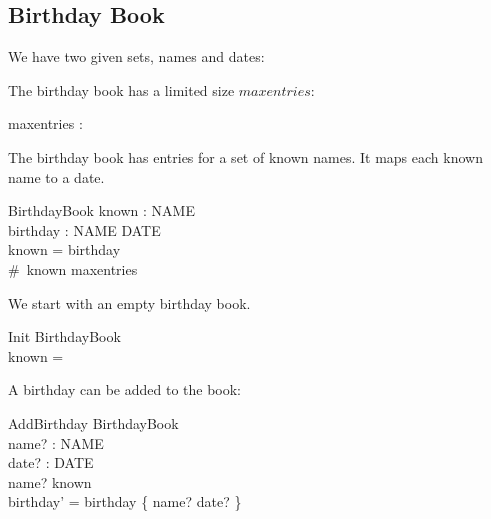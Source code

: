\documentclass[a4paper]{article}
\begin{document}
\subsection*{Birthday Book}

We have two given sets, names and dates:
\begin{zed}
\end{zed}
The birthday book has a limited size $maxentries$:
\begin{axdef}
  maxentries : \nat
\end{axdef}
The birthday book has entries for a set of known
names. It maps each known name to a date. 
\begin{schema}{BirthdayBook}
  known : \power NAME\\
  birthday : NAME \pfun DATE\\
  \where
  known = \dom birthday\\
  \#~known \leq maxentries
\end{schema}
We start with an empty birthday book.
\begin{schema}{Init}
  BirthdayBook\\
  \where
  known = \emptyset
\end{schema}
A birthday can be added to the book:
\begin{schema}{AddBirthday}
  \Delta BirthdayBook\\
  name? : NAME\\
  date? : DATE\\
  \where
  name? \notin known\\
  birthday' = birthday \cup \{ name? \mapsto date? \}\\
\end{schema}
\end{document}
